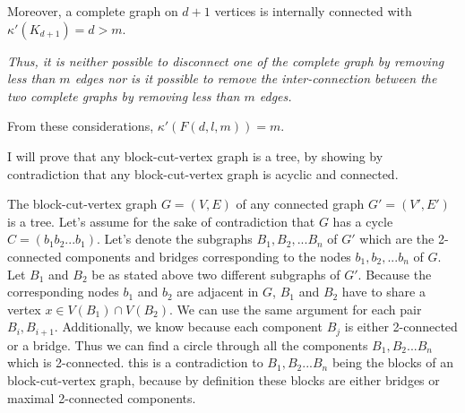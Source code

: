 \documentclass[a4paper]{article}
\begin{document}
\begin{solution}{14}
		Moreover, a complete graph on $d+1$ vertices is internally connected with $\kappa'(K_{d+1}) = d > m$.

		\emph{Thus, it is neither possible to disconnect one of the complete graph by removing less than $m$ edges nor is it possible to remove the inter-connection between the two complete graphs by removing less than $m$ edges.}

		From these considerations, $\kappa'(F(d,l,m)) = m$.
	\end{solution}
	\newpage
	\begin{solution}{15}
		I will prove that any block-cut-vertex graph is a tree, by showing by contradiction that any block-cut-vertex graph is acyclic and connected. 
		\begin{theorem}{The block-cut-vertex graph $G=(V,E)$ of any connected graph $G'=(V',E')$ is a tree.}
		Let's assume for the sake of contradiction that $G$ has a cycle $C=(b_1b_2...b_1)$.
		Let's denote the subgraphs $B_1,B_2,...B_n$ of $G'$ which are the 2-connected components and bridges corresponding to the nodes $b_1,b_2,...b_n$ of $G$. 
		Let $B_1$ and $B_2$ be as stated above two different subgraphs of $G'$. 
		Because the corresponding nodes $b_1$ and $b_2$ are adjacent in $G$, $B_1$ and $B_2$ have to share a vertex $x \in V(B_1) \cap V(B_2)$. 
		We can use the same argument for each pair $B_i, B_{i+1}$. 
		Additionally, we know because each component $B_j$ is either 2-connected or a bridge. 
		Thus we can find a circle through all the components $B_1, B_2...B_n$ which is 2-connected.
		this is a contradiction to $B_1, B_2...B_n$ being the blocks of an block-cut-vertex graph, because by definition these blocks are either bridges or maximal 2-connected components.
		\end{theorem}
	\end{solution}
	\newpage
	\begin{solution}{16}
	\end{solution}
	
\end{document}
